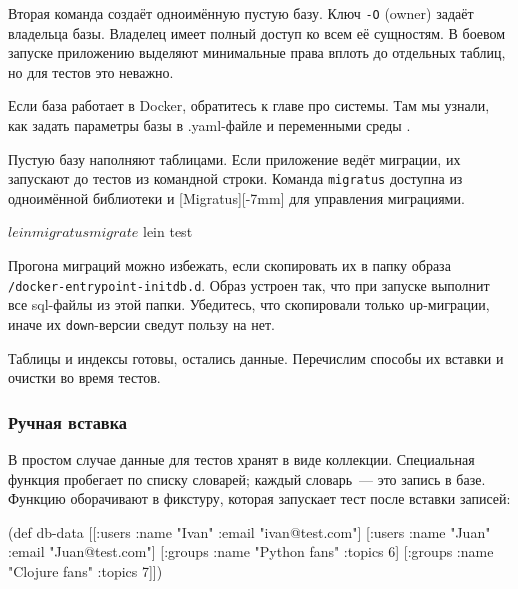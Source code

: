Вторая команда создаёт одноимённую пустую базу. Ключ \verb|-O| (owner) задаёт
владельца базы. Владелец имеет полный доступ ко всем её сущностям. В боевом
запуске приложению выделяют минимальные права вплоть до отдельных таблиц, но для
тестов это неважно.


Если база работает в Docker, обратитесь к главе про системы. Там мы узнали, как
задать параметры базы в .yaml-файле и переменными среды .


Пустую базу наполняют таблицами. Если приложение ведёт миграции, их запускают до
тестов из командной строки. Команда \verb|migratus| доступна из одноимённой
библиотеки и [Migratus][-7mm]
для управления миграциями.

\begin{english}
  \begin{clojure}
$ lein migratus migrate
$ lein test
  \end{clojure}
\end{english}

Прогона миграций можно избежать, если скопировать их в папку образа
\verb|/docker-entrypoint-initdb.d|. Образ устроен так, что при запуске
выполнит все sql-файлы из этой папки. Убедитесь, что скопировали только
\verb|up|-миграции, иначе их \verb|down|-версии сведут пользу на нет.

Таблицы и индексы готовы, остались данные. Перечислим способы их вставки и
очистки во время тестов.

\subsubsection*{Ручная вставка}

В простом случае данные для тестов хранят в виде коллекции. Специальная функция
пробегает по списку словарей; каждый словарь~--- это запись в базе. Функцию
оборачивают в фикстуру, которая запускает тест после вставки записей:

\ifx\devicetype\mobile

\begin{english}
  \begin{clojure}
(def db-data
 [[:users {:name "Ivan"
           :email "ivan@test.com"}]
  [:users {:name "Juan"
           :email "Juan@test.com"}]
  [:groups {:name "Python fans"
            :topics 6}]
  [:groups {:name "Clojure fans"
            :topics 7}]])
  \end{clojure}
\end{english}

